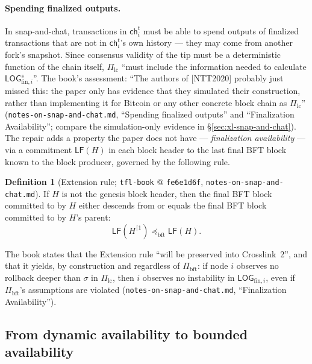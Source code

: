 \documentclass[11pt,a4paper]{article}
\theoremstyle{definition}
\newtheorem{definition}[theorem]{Definition}
\begin{document}
\paragraph{Spending finalized outputs.} In snap-and-chat, transactions in
$\mathsf{ch}_i^t$ must be able to spend outputs of finalized transactions
that are not in $\mathsf{ch}_i^t$'s own history --- they may come from
another fork's snapshot. Since consensus validity of the tip must be a
deterministic function of the chain itself, $\Pi_{\mathrm{lc}}$ ``must
include the information needed to calculate
$\mathsf{LOG}_{\mathrm{fin},i}^s$''. The book's assessment: ``The authors
of [NTT2020] probably just missed this: the paper only has evidence that
they simulated their construction, rather than implementing it for
Bitcoin or any other concrete block chain as $\Pi_{\mathrm{lc}}$''
(\texttt{notes-on-snap-and-chat.md}, ``Spending finalized outputs'' and
``Finalization Availability''; compare the simulation-only evidence in
\S\ref{sec:xl-snap-and-chat}). The repair adds a property the paper does
not have --- \emph{finalization availability} --- via a commitment
$\mathsf{LF}(H)$ in each block header to the last final BFT block known to
the block producer, governed by the following rule.

\begin{definition}[Extension rule; \texttt{tfl-book} @ \texttt{fe6e1d6f},
\texttt{notes-on-snap-and-chat.md}]\label{def:xl-extension}
If $H$ is not the genesis block header, then the final BFT block committed
to by $H$ either descends from or equals the final BFT block committed to
by $H$'s parent:
\[
\mathsf{LF}(H^{\lceil 1}) \preceq_{\mathrm{bft}} \mathsf{LF}(H).
\]
\end{definition}

The book states that the Extension rule ``will be preserved into
Crosslink~2'', and that it yields, by construction and regardless of
$\Pi_{\mathrm{bft}}$: if node $i$ observes no rollback deeper than
$\sigma$ in $\Pi_{\mathrm{lc}}$, then $i$ observes no instability in
$\mathsf{LOG}_{\mathrm{fin},i}$, even if $\Pi_{\mathrm{bft}}$'s
assumptions are violated (\texttt{notes-on-snap-and-chat.md},
``Finalization Availability'').

\subsection{From dynamic availability to bounded availability}
\label{sec:xl-bounded-availability}
\end{document}
